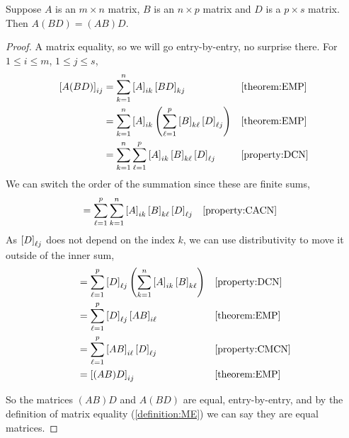 \documentclass{ximera}
\begin{document}
\begin{theorem}
  \label{theorem:MMA}

  Suppose $A$ is an $m\times n$ matrix, $B$ is an $n\times p$ matrix and $D$ is a $p\times s$ matrix.  Then  $A(BD)=(AB)D$.

  \begin{proof}
    A matrix equality, so we will go entry-by-entry, no surprise there.    For $1\leq i\leq m$, $1\leq j\leq s$,
    \begin{align*}
      \left\lbrack A(BD)\right\rbrack_{ij}
      &=\sum_{k=1}^{n}\left\lbrack A\right\rbrack_{ik}\left\lbrack BD\right\rbrack_{kj}
      &&\ref{theorem:EMP}\\
      &=\sum_{k=1}^{n}\left\lbrack A\right\rbrack_{ik}\left(\sum_{\ell=1}^{p}\left\lbrack B\right\rbrack_{k\ell}\left\lbrack D\right\rbrack_{\ell j}\right)
      &&\ref{theorem:EMP}\\
      &=\sum_{k=1}^{n}\sum_{\ell=1}^{p}\left\lbrack A\right\rbrack_{ik}\left\lbrack B\right\rbrack_{k\ell}\left\lbrack D\right\rbrack_{\ell j}
      &&\ref{property:DCN}\\
    \end{align*}
    We can switch the order of the summation since these are finite sums,
    \begin{align*}
      &=\sum_{\ell=1}^{p}\sum_{k=1}^{n}\left\lbrack A\right\rbrack_{ik}\left\lbrack B\right\rbrack_{k\ell}\left\lbrack D\right\rbrack_{\ell j}
      &&\ref{property:CACN}
    \end{align*}
    As $\left\lbrack D\right\rbrack_{\ell j}$ does not depend on the index $k$, we can use distributivity to move it outside of the inner sum,
    \begin{align*}
      &=\sum_{\ell=1}^{p}\left\lbrack D\right\rbrack_{\ell j}\left(\sum_{k=1}^{n}\left\lbrack A\right\rbrack_{ik}\left\lbrack B\right\rbrack_{k\ell}\right)
      &&\ref{property:DCN}\\
      &=\sum_{\ell=1}^{p}\left\lbrack D\right\rbrack_{\ell j}\left\lbrack AB\right\rbrack_{i\ell}
      &&\ref{theorem:EMP}\\
      &=\sum_{\ell=1}^{p}\left\lbrack AB\right\rbrack_{i\ell}\left\lbrack D\right\rbrack_{\ell j}
      &&\ref{property:CMCN}\\
      &=\left\lbrack(AB)D\right\rbrack_{ij}&&\ref{theorem:EMP}
    \end{align*}
    
    So the matrices $(AB)D$ and $A(BD)$ are equal, entry-by-entry, and by the definition of matrix equality (\ref{definition:ME}) we can say they are equal matrices.
    
  \end{proof}
\end{theorem}
\end{document}
